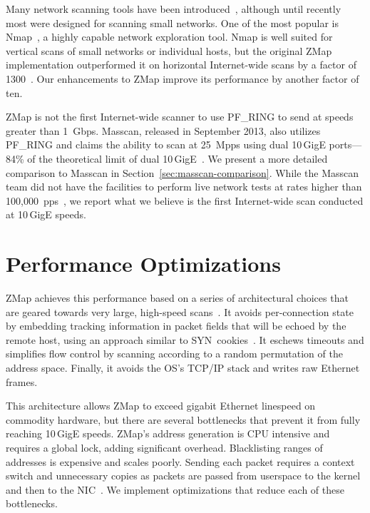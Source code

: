 Many network scanning tools have been
introduced~\cite{scanrand,unicornscan,masscan-10g,nmap,zmap}, although until
recently most were designed for scanning small networks. One of the most
popular is Nmap~\cite{nmap}, a highly capable network exploration tool. Nmap
is well suited for vertical scans of small networks or individual hosts, but
the original ZMap implementation outperformed it on horizontal Internet-wide
scans by a factor of 1300~\cite{zmap}. Our enhancements to ZMap improve its
performance by another factor of ten.

ZMap is not the first Internet-wide scanner to use PF\_RING to send at speeds
greater than 1~Gbps. Masscan, released in September 2013, also utilizes
PF\_RING and claims the ability to scan at 25~Mpps using dual 10\,GigE
ports---84\% of the theoretical limit of dual 10\,GigE~\cite{masscan-10g}. We
present a more detailed comparison to Masscan in
Section~\ref{sec:masscan-comparison}. While the Masscan team did not have the
facilities to perform live network tests at rates higher than
100,000~pps~\cite{masscan-10g}, we report what we believe is the first
Internet-wide scan conducted at 10\,GigE speeds.

\section{Performance Optimizations}
\label{sec:optimizations}

ZMap achieves this performance based on a series of architectural choices
that are geared towards very large, high-speed scans~\cite{zmap}. It avoids
per-connection state by embedding tracking information in packet fields that
will be echoed by the remote host, using an approach similar to
SYN~cookies~\cite{bernstein1996syn}. It eschews timeouts and simplifies flow
control by scanning according to a random permutation of the address space.
Finally, it avoids the OS's TCP/IP stack and writes raw Ethernet frames.

This architecture allows ZMap to exceed gigabit Ethernet linespeed on
commodity hardware, but there are several bottlenecks that prevent it from
fully reaching 10\,GigE speeds. ZMap's address generation is CPU intensive
and requires a global lock, adding significant overhead. Blacklisting ranges
of addresses is expensive and scales poorly. Sending each packet requires a
context switch and unnecessary copies as packets are passed from userspace to
the kernel and then to the NIC~\cite{multi-core-network}. We implement
optimizations that reduce each of these bottlenecks.

